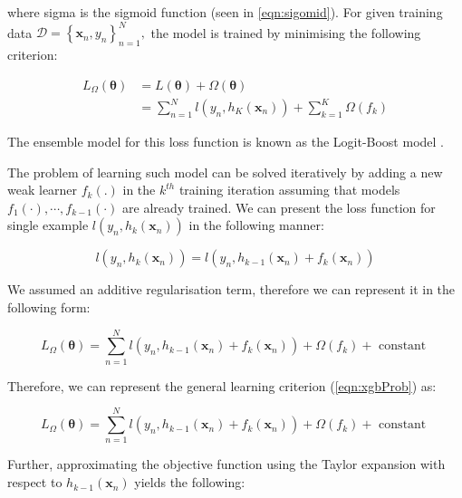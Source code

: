 where sigma is the sigmoid function (seen in \autoref{eqn:sigomid}).
For given training data $\mathscr{D}=\left\{\mathbf{x}_{n}, y_{n}\right\}_{n=1}^{N},$ the model is trained by minimising the following criterion:

\begin{equation}
\label{eqn:xgbProb}
\begin{aligned}
L_{\Omega}(\boldsymbol{\theta}) &=L(\boldsymbol{\theta})+\Omega(\boldsymbol{\theta}) \\
&=\sum_{n=1}^{N} l\left(y_{n}, h_{K}\left(\mathbf{x}_{n}\right)\right)+\sum_{k=1}^{K} \Omega\left(f_{k}\right)
\end{aligned}
\end{equation}

The ensemble model for this loss function is known as the Logit-Boost model \cite{chen2015xgboost}.

The problem of learning such model can be solved iteratively by adding a new weak learner $f_{k}(.)$ in the $k^{th}$  training iteration assuming that models $f_{1}(\cdot), \cdots, f_{k-1}(\cdot)$ are already trained. We can present the loss function for single example $l\left(y_{n}, h_{k}\left(\mathbf{x}_{n}\right)\right)$ in the following manner:

\begin{equation}
l\left(y_{n}, h_{k}\left(\mathbf{x}_{n}\right)\right)=l\left(y_{n}, h_{k-1}\left(\mathbf{x}_{n}\right)+f_{k}\left(\mathbf{x}_{n}\right)\right)
\end{equation}

We assumed an additive regularisation term, therefore we can represent it in the following form:

\begin{equation}
L_{\Omega}(\boldsymbol{\theta})=\sum_{n=1}^{N} l\left(y_{n}, h_{k-1}\left(\mathbf{x}_{n}\right)+f_{k}\left(\mathbf{x}_{n}\right)\right)+\Omega\left(f_{k}\right)+\text { constant }
\end{equation}

Therefore, we can represent the general learning criterion (\autoref{eqn:xgbProb}) as:

\begin{equation}
\label{eqn:xgb14}
L_{\Omega}(\boldsymbol{\theta})=\sum_{n=1}^{N} l\left(y_{n}, h_{k-1}\left(\mathbf{x}_{n}\right)+f_{k}\left(\mathbf{x}_{n}\right)\right)+\Omega\left(f_{k}\right)+\text { constant }
\end{equation}

Further, approximating the objective function using the Taylor expansion with respect to $h_{k-1}\left(\mathbf{x}_{n}\right)$ yields the following:

